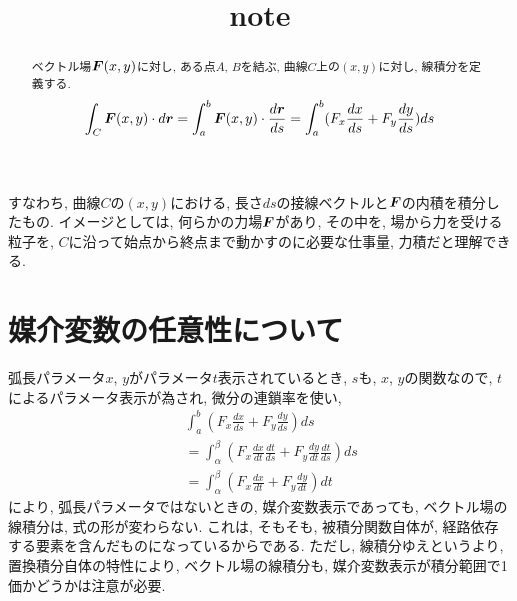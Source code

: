 \documentclass{jsarticle} \usepackage[dvipdfmx]{graphicx} \usepackage[dvipdfmx]{hyperref}
\title{note}
\newcommand*{\mbold}[1]{\mbox{\boldmath $#1$}}
\begin{document}
\maketitle

\begin{abstract}
  ベクトル場$\mbold{F}(x, y)$に対し, ある点$A$, $B$を結ぶ, 曲線$C$上の$(x, y)$に対し, 線積分を定義する. 
  \begin{equation}
    \int_C \mbold{F}(x, y)\cdot d\mbold{r}
    = \int_a^b \mbold{F}(x, y) \cdot \frac{d\mbold{r}}{ds}
    = \int_a^b (F_x \frac{dx}{ds} + F_y \frac{dy}{ds})ds
  \end{equation}
\end{abstract}
すなわち, 曲線$C$の$(x, y)$における, 長さ$ds$の接線ベクトルと$\mbold{F}$の内積を積分したもの. イメージとしては, 何らかの力場$\mbold{F}$があり, その中を, 場から力を受ける粒子を, $C$に沿って始点から終点まで動かすのに必要な仕事量, 力積だと理解できる. 
\section*{媒介変数の任意性について}
弧長パラメータ$x$, $y$がパラメータ$t$表示されているとき, $s$も, $x$, $y$の関数なので, $t$によるパラメータ表示が為され, 
微分の連鎖率を使い, 
\begin{eqnarray}
  && \int_a^b (F_x \frac{dx}{ds} + F_y \frac{dy}{ds})ds \nonumber\\
  && = \int_{\alpha}^{\beta} (F_x \frac{dx}{dt}\frac{dt}{ds} + F_y \frac{dy}{dt}\frac{dt}{ds})ds \nonumber \\
  && = \int_{\alpha}^{\beta} (F_x \frac{dx}{dt} + F_y \frac{dy}{dt})dt 
\end{eqnarray}
により, 
弧長パラメータではないときの, 媒介変数表示であっても, ベクトル場の線積分は, 式の形が変わらない. 
これは, そもそも, 被積分関数自体が, 経路依存する要素を含んだものになっているからである. 
ただし, 線積分ゆえというより, 置換積分自体の特性により, ベクトル場の線積分も, 媒介変数表示が積分範囲で1価かどうかは注意が必要. 
\end{document}
